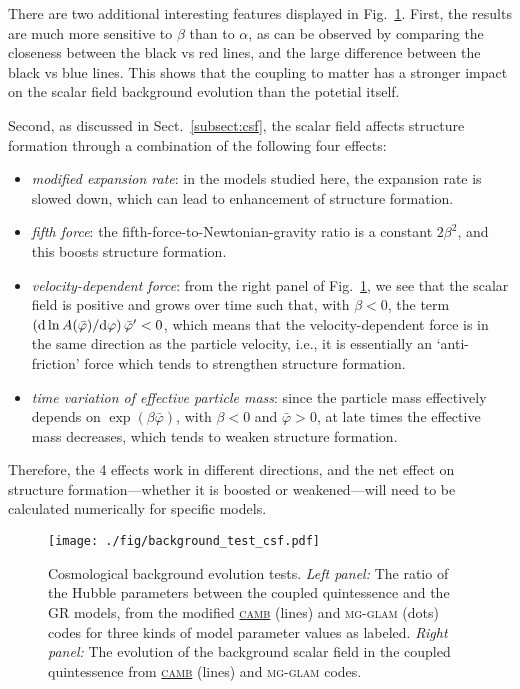 There are two additional interesting features displayed in Fig.~\ref{fig:code_test_background_csf}. First, the results are much more sensitive to $\beta$ than to $\alpha$, as can be observed by comparing the closeness between the black vs red lines, and the large difference between the black vs blue lines. This shows that the coupling to matter has a stronger impact on the scalar field background evolution than the potetial itself.

Second, as discussed in Sect.~\ref{subsect:csf}, the scalar field affects structure formation through a combination of the following four effects:
\begin{itemize}
    \item \textit{modified expansion rate}: in the models studied here, the expansion rate is slowed down, which can lead to enhancement of structure formation.
    \item \textit{fifth force}: the fifth-force-to-Newtonian-gravity ratio is a constant $2\beta^2$, and this boosts structure formation.
    \item \textit{velocity-dependent force}: from the right panel of Fig.~\ref{fig:code_test_background_csf}, we see that the scalar field is positive and grows over time such that, with $\beta<0$, the term $\left({\rm d}\ln A(\bar{\varphi})/{\rm d}\varphi\right)\bar{\varphi}'<0$, which means that the velocity-dependent force is in the same direction as the particle velocity, i.e., it is essentially an `anti-friction' force which tends to strengthen structure formation.
    \item \textit{time variation of effective particle mass}: since the particle mass effectively depends on $\exp(\beta\bar{\varphi})$, with $\beta<0$ and $\bar{\varphi}>0$, at late times the effective mass decreases, which tends to weaken structure formation.
\end{itemize}
Therefore, the 4 effects work in different directions, and the net effect on structure formation---whether it is boosted or weakened---will need to be calculated numerically for specific models.


\begin{figure}
    \centering
    \texttt{[image: ./fig/background\_test\_csf.pdf]}
\caption{
    Cosmological background evolution tests.
    \textit{Left panel:} The ratio of the Hubble parameters between the coupled quintessence and the \ac{GR} models, from the modified \href{https://camb.info/}{\textsc{camb}} (lines) and \textsc{mg-glam} (dots) codes for three kinds of model parameter values as labeled.  
    \textit{Right panel:} The evolution of the background scalar field in the coupled quintessence from \href{https://camb.info/}{\textsc{camb}} (lines) and \textsc{mg-glam} codes.
}
    \label{fig:code_test_background_csf}
\end{figure}

